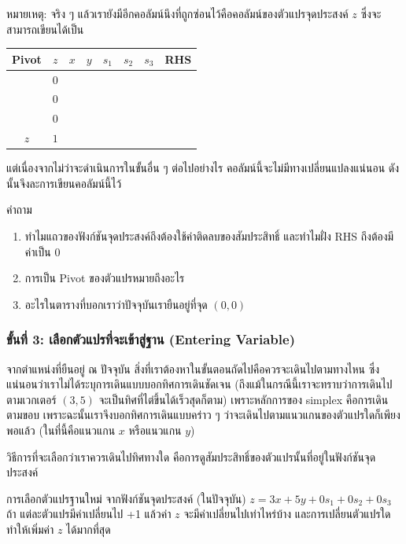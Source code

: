 \newpage
หมายเหตุ: จริง ๆ แล้วเรายังมีอีกคอลัมน์นึงที่ถูกซ่อนไว้คือคอลัมน์ของตัวแปรจุดประสงค์ $z$ ซึ่งจะสามารถเขียนได้เป็น
    \begin{center}
    \renewcommand{\arraystretch}{1.4}
        \begin{tabular}{|c|cccccc|c|}
            \hline
            \textbf{Pivot} & $z$ & $x$ & $y$ &  $s_1$ & $s_2$ & $s_3$ & \textbf{RHS} \\
            \hline
            $ $ &$0$ & $ $ & $ $  & $ $ & $ $ & $ $ & $ $ \\
            $ $ &$0$ & $ $ & $ $  & $ $ & $ $ & $ $ & $ $ \\
            $ $ &$0$ & $ $ & $ $  & $ $ & $ $ & $ $ & $ $ \\
            \hline
            $z$& $1$ & $ $ & $ $  & $ $ & $ $ & $ $ & $ $ \\
            \hline
        \end{tabular}
    \end{center}
แต่เนื่องจากไม่ว่าจะดำเนินการในขั้นอื่น ๆ ต่อไปอย่างไร คอลัมน์นี้จะไม่มีทางเปลี่ยนแปลงแน่นอน ดังนั้นจึงละการเขียนคอลัมน์นี้ไว้
\begin{property}
    {คำถาม}{}
    \begin{enumerate}
    \item ทำไมแถวของฟังก์ชันจุดประสงค์ถึงต้องใช้ค่าติดลบของสัมประสิทธิ์ และทำไมฝั่ง RHS ถึงต้องมีค่าเป็น 0
    \item การเป็น Pivot ของตัวแปรหมายถึงอะไร
    \item อะไรในตารางที่บอกเราว่าปัจจุบันเรายืนอยู่ที่จุด $(0,0)$
\end{enumerate}
\end{property}
\newpage
\subsubsection*{ขั้นที่ 3: เลือกตัวแปรที่จะเข้าสู่ฐาน (Entering Variable)}
จากตำแหน่งที่ยืนอยู่ ณ ปัจจุบัน สิ่งที่เราต้องหาในขั้นตอนถัดไปคือควรจะเดินไปตามทางไหน ซึ่งแน่นอนว่าเราไม่ได้ระบุการเดินแบบบอกทิศการเดินชัดเจน (ถึงแม้ในกรณีนี้เราจะทราบว่าการเดินไปตามเวกเตอร์ $(3,5)$ จะเป็นทิศที่ไต่ขึ้นได้เร็วสุดก็ตาม)
เพราะหลักการของ simplex คือการเดินตามขอบ
เพราะฉะนั้นเราจึงบอกทิศการเดินแบบคร่าว ๆ ว่าจะเดินไปตามแนวแกนของตัวแปรใดก็เพียงพอแล้ว (ในที่นี้คือแนวแกน $x$ หรือแนวแกน $y$)

วิธีการที่จะเลือกว่าเราควรเดินไปทิศทางใด คือการดูสัมประสิทธิ์ของตัวแปรนั้นที่อยู่ในฟังก์ชันจุดประสงค์
\begin{example}
    {การเลือกตัวแปรฐานใหม่}{}
    จากฟังก์ชันจุดประสงค์ (ในปัจจุบัน) $z = 3x + 5y + 0s_1 + 0s_2 + 0s_3$ ถ้า แต่ละตัวแปรมีค่าเปลี่ยนไป +1 แล้วค่า $z$ จะมีค่าเปลี่ยนไปเท่าไหร่บ้าง และการเปลี่ยนตัวแปรใดทำให้เพิ่มค่า $z$ ได้มากที่สุด
\end{example}

